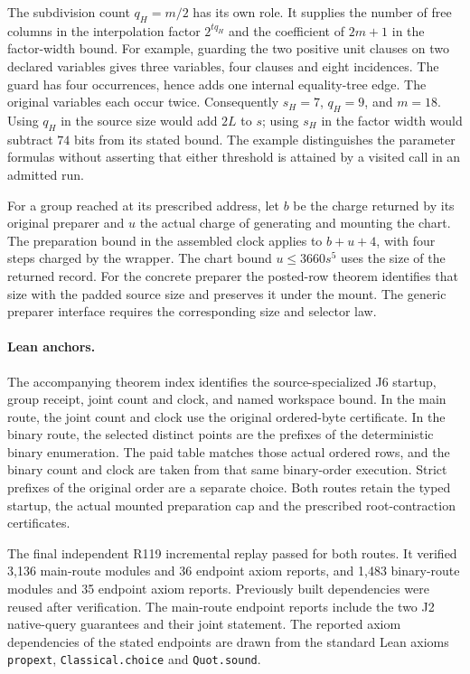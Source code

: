 \documentclass[
  11pt,
]{article}
\begin{document}
The subdivision count \(q_H=m/2\) has its own role. It supplies the number
of free columns in the interpolation factor \(2^{tq_H}\) and the
coefficient of \(2m+1\) in the factor-width bound. For example, guarding
the two positive unit clauses on two declared variables gives three
variables, four clauses and eight incidences. The guard has four
occurrences, hence adds one internal equality-tree edge. The original
variables each occur twice. Consequently \(s_H=7\), \(q_H=9\), and
\(m=18\). Using \(q_H\) in the source size would add \(2L\) to \(s\);
using \(s_H\) in the factor width would subtract \(74\) bits from its
stated bound. The example distinguishes the parameter formulas without
asserting that either threshold is attained by a visited call in an
admitted run.

For a group reached at its prescribed address, let \(b\) be the charge
returned by its original preparer and \(u\) the actual charge of
generating and mounting the chart. The preparation bound in the
assembled clock applies to \(b+u+4\), with four steps charged by the
wrapper. The chart bound \(u\le 3660s^5\) uses the size of the returned
record. For the concrete preparer the posted-row theorem identifies
that size with the padded source size and preserves it under the mount.
The generic preparer interface requires the corresponding size and selector law.

\paragraph*{Lean anchors.}
The accompanying theorem index identifies the source-specialized J6
startup, group receipt, joint count and clock, and named workspace
bound. In the main route, the joint count and clock use the original
ordered-byte certificate. In the binary route, the selected distinct
points are the prefixes of the deterministic binary enumeration. The
paid table matches those actual ordered rows, and the binary count and
clock are taken from that same binary-order execution. Strict prefixes
of the original order are a separate choice. Both routes retain the
typed startup, the actual mounted preparation cap and the prescribed
root-contraction certificates.

The final independent R119 incremental replay passed for both routes.
It verified 3,136 main-route modules and 36 endpoint axiom reports,
and 1,483 binary-route modules and 35 endpoint axiom reports. Previously
built dependencies were reused after verification. The main-route
endpoint reports include the two J2 native-query guarantees and their
joint statement. The reported axiom dependencies of the stated
endpoints are drawn from the standard Lean axioms
\texttt{propext}, \texttt{Classical.choice} and \texttt{Quot.sound}.
\end{document}
